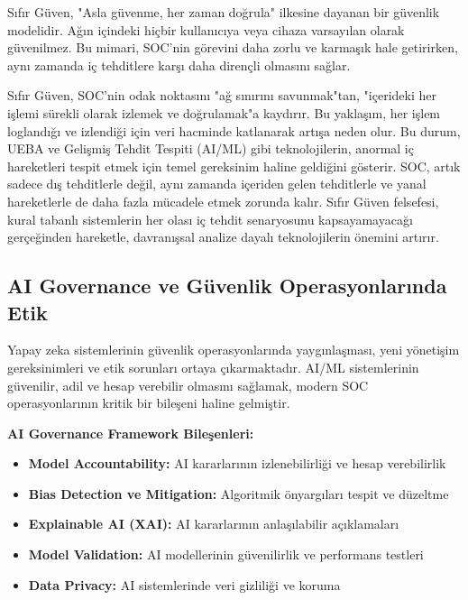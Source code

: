 Sıfır Güven, "Asla güvenme, her zaman doğrula" ilkesine dayanan bir güvenlik modelidir. Ağın içindeki hiçbir kullanıcıya veya cihaza varsayılan olarak güvenilmez. Bu mimari, SOC'nin görevini daha zorlu ve karmaşık hale getirirken, aynı zamanda iç tehditlere karşı daha dirençli olmasını sağlar.

Sıfır Güven, SOC'nin odak noktasını "ağ sınırını savunmak"tan, "içerideki her işlemi sürekli olarak izlemek ve doğrulamak"a kaydırır. Bu yaklaşım, her işlem loglandığı ve izlendiği için veri hacminde katlanarak artışa neden olur. Bu durum, UEBA ve Gelişmiş Tehdit Tespiti (AI/ML) gibi teknolojilerin, anormal iç hareketleri tespit etmek için temel gereksinim haline geldiğini gösterir. SOC, artık sadece dış tehditlerle değil, aynı zamanda içeriden gelen tehditlerle ve yanal hareketlerle de daha fazla mücadele etmek zorunda kalır. Sıfır Güven felsefesi, kural tabanlı sistemlerin her olası iç tehdit senaryosunu kapsayamayacağı gerçeğinden hareketle, davranışsal analize dayalı teknolojilerin önemini artırır.

\subsection{AI Governance ve Güvenlik Operasyonlarında Etik}

Yapay zeka sistemlerinin güvenlik operasyonlarında yaygınlaşması, yeni yönetişim gereksinimleri ve etik sorunları ortaya çıkarmaktadır. AI/ML sistemlerinin güvenilir, adil ve hesap verebilir olmasını sağlamak, modern SOC operasyonlarının kritik bir bileşeni haline gelmiştir.

\textbf{AI Governance Framework Bileşenleri:}
\begin{itemize}
    \item \textbf{Model Accountability:} AI kararlarının izlenebilirliği ve hesap verebilirlik
    \item \textbf{Bias Detection ve Mitigation:} Algoritmik önyargıları tespit ve düzeltme
    \item \textbf{Explainable AI (XAI):} AI kararlarının anlaşılabilir açıklamaları
    \item \textbf{Model Validation:} AI modellerinin güvenilirlik ve performans testleri
    \item \textbf{Data Privacy:} AI sistemlerinde veri gizliliği ve koruma
\end{itemize}

